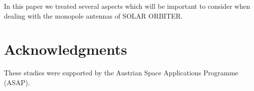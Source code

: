 \documentclass[a4paper,twocolumn]{esapub2005} %
\begin{document}
In this paper we treated several aspects which will be important to consider when dealing with the monopole antennas of SOLAR ORBITER.



\section*{Acknowledgments}
These studies were supported by the Austrian Space Applications Programme (ASAP).



   
   
\end{document}
